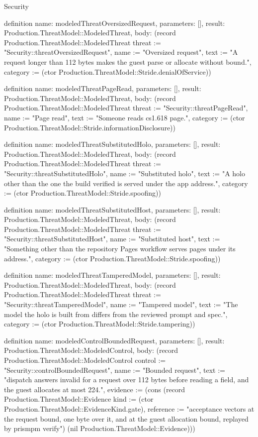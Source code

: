 \begin{lexlean}{Security}
\begin{semanticmodule}
definition{
  name: modeledThreatOversizedRequest,
  parameters: [],
  result: Production.ThreatModel::ModeledThreat,
  body: (record Production.ThreatModel::ModeledThreat {threat := "Security::threatOversizedRequest", name := "Oversized request", text := "A request longer than 112 bytes makes the guest parse or allocate without bound.", category := (ctor Production.ThreatModel::Stride.denialOfService)})
}

definition{
  name: modeledThreatPageRead,
  parameters: [],
  result: Production.ThreatModel::ModeledThreat,
  body: (record Production.ThreatModel::ModeledThreat {threat := "Security::threatPageRead", name := "Page read", text := "Someone reads cs1.618 page.", category := (ctor Production.ThreatModel::Stride.informationDisclosure)})
}

definition{
  name: modeledThreatSubstitutedHolo,
  parameters: [],
  result: Production.ThreatModel::ModeledThreat,
  body: (record Production.ThreatModel::ModeledThreat {threat := "Security::threatSubstitutedHolo", name := "Substituted holo", text := "A holo other than the one the build verified is served under the app address.", category := (ctor Production.ThreatModel::Stride.spoofing)})
}

definition{
  name: modeledThreatSubstitutedHost,
  parameters: [],
  result: Production.ThreatModel::ModeledThreat,
  body: (record Production.ThreatModel::ModeledThreat {threat := "Security::threatSubstitutedHost", name := "Substituted host", text := "Something other than the repository Pages workflow serves pages under its address.", category := (ctor Production.ThreatModel::Stride.spoofing)})
}

definition{
  name: modeledThreatTamperedModel,
  parameters: [],
  result: Production.ThreatModel::ModeledThreat,
  body: (record Production.ThreatModel::ModeledThreat {threat := "Security::threatTamperedModel", name := "Tampered model", text := "The model the holo is built from differs from the reviewed prompt and spec.", category := (ctor Production.ThreatModel::Stride.tampering)})
}

definition{
  name: modeledControlBoundedRequest,
  parameters: [],
  result: Production.ThreatModel::ModeledControl,
  body: (record Production.ThreatModel::ModeledControl {control := "Security::controlBoundedRequest", name := "Bounded request", text := "dispatch answers invalid for a request over 112 bytes before reading a field, and the guest allocates at most 224.", evidence := (cons (record Production.ThreatModel::Evidence {kind := (ctor Production.ThreatModel::EvidenceKind.gate), reference := "acceptance vectors at the request bound, one byte over it, and at the guest allocation bound, replayed by prismpm verify"}) (nil Production.ThreatModel::Evidence))})
}


\end{semanticmodule}
\end{lexlean}
